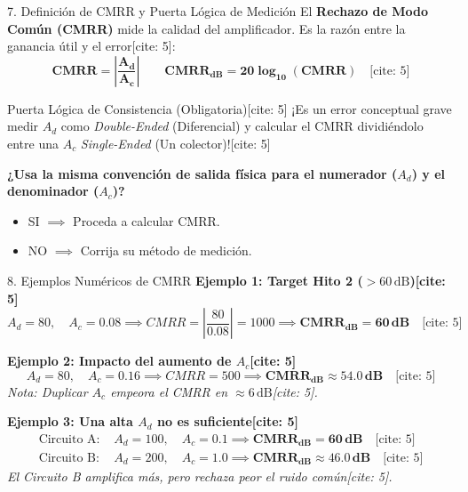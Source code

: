 \documentclass[aspectratio=169]{beamer}
\begin{document}
\begin{frame}{7. Definición de CMRR y Puerta Lógica de Medición}
    El \textbf{Rechazo de Modo Común (CMRR)} mide la calidad del amplificador. Es la razón entre la ganancia útil y el error[cite: 5]:
    \begin{equation*}
        \mathbf{CMRR = \left|\frac{A_d}{A_c}\right|} \qquad \mathbf{CMRR_{dB} = 20 \log_{10} (CMRR)} \quad \text{[cite: 5]}
    \end{equation*}
    
    \begin{alertblock}{Puerta Lógica de Consistencia (Obligatoria)[cite: 5]}
        ¡Es un error conceptual grave medir $A_d$ como \textit{Double-Ended} (Diferencial) y calcular el CMRR dividiéndolo entre una $A_c$ \textit{Single-Ended} (Un colector)![cite: 5]
        
        \textbf{¿Usa la misma convención de salida física para el numerador ($A_d$) y el denominador ($A_c$)?}
        \begin{itemize}
            \item SI $\implies$ Proceda a calcular CMRR.
            \item NO $\implies$ Corrija su método de medición.
        \end{itemize}
    \end{alertblock}
\end{frame}

\begin{frame}{8. Ejemplos Numéricos de CMRR}
    \textbf{Ejemplo 1: Target Hito 2 ($> 60\,\text{dB}$)[cite: 5]}
    \begin{equation*}
        A_d = 80, \quad A_c = 0.08 \implies CMRR = \left| \frac{80}{0.08} \right| = 1000 \implies \mathbf{CMRR_{dB} = 60\,\text{dB}} \quad \text{[cite: 5]}
    \end{equation*}
    
    \textbf{Ejemplo 2: Impacto del aumento de $A_c$[cite: 5]}
    \begin{equation*}
        A_d = 80, \quad A_c = 0.16 \implies CMRR = 500 \implies \mathbf{CMRR_{dB} \approx 54.0\,\text{dB}} \quad \text{[cite: 5]}
    \end{equation*}
    \textit{Nota: Duplicar $A_c$ empeora el CMRR en $\approx 6\,\text{dB}$[cite: 5].}
    
    \vspace{0.2cm}
    \textbf{Ejemplo 3: Una alta $A_d$ no es suficiente[cite: 5]}
    \begin{align*}
        \text{Circuito A: } & A_d = 100, \quad A_c = 0.1 \implies \mathbf{CMRR_{dB} = 60\,\text{dB}} \quad \text{[cite: 5]} \\
        \text{Circuito B: } & A_d = 200, \quad A_c = 1.0 \implies \mathbf{CMRR_{dB} \approx 46.0\,\text{dB}} \quad \text{[cite: 5]}
    \end{align*}
    \textit{El Circuito B amplifica más, pero rechaza peor el ruido común[cite: 5].}
\end{frame}
\end{document}
